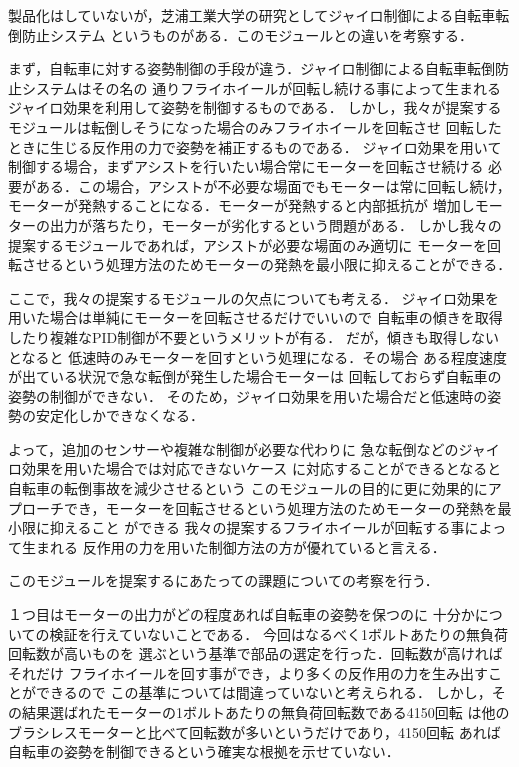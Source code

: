 \documentclass[uplatex,dvipdfmx]{jsarticle}
\begin{document}
製品化はしていないが，芝浦工業大学の研究としてジャイロ制御による自転車転倒防止システム
というものがある．このモジュールとの違いを考察する．

まず，自転車に対する姿勢制御の手段が違う．ジャイロ制御による自転車転倒防止システムはその名の
通りフライホイールが回転し続ける事によって生まれるジャイロ効果を利用して姿勢を制御するものである．
しかし，我々が提案するモジュールは転倒しそうになった場合のみフライホイールを回転させ
回転したときに生じる反作用の力で姿勢を補正するものである．
ジャイロ効果を用いて制御する場合，まずアシストを行いたい場合常にモーターを回転させ続ける
必要がある．この場合，アシストが不必要な場面でもモーターは常に回転し続け，
モーターが発熱することになる．モーターが発熱すると内部抵抗が
増加しモーターの出力が落ちたり，モーターが劣化するという問題がある．
しかし我々の提案するモジュールであれば，アシストが必要な場面のみ適切に
モーターを回転させるという処理方法のためモーターの発熱を最小限に抑えることができる．


ここで，我々の提案するモジュールの欠点についても考える．
ジャイロ効果を用いた場合は単純にモーターを回転させるだけでいいので
自転車の傾きを取得したり複雑なPID制御が不要というメリットが有る．
だが，傾きも取得しないとなると
低速時のみモーターを回すという処理になる．その場合
ある程度速度が出ている状況で急な転倒が発生した場合モーターは
回転しておらず自転車の姿勢の制御ができない．
そのため，ジャイロ効果を用いた場合だと低速時の姿勢の安定化しかできなくなる．

よって，追加のセンサーや複雑な制御が必要な代わりに
急な転倒などのジャイロ効果を用いた場合では対応できないケース
に対応することができるとなると自転車の転倒事故を減少させるという
このモジュールの目的に更に効果的にアプローチでき，モーターを回転させるという処理方法のためモーターの発熱を最小限に抑えること
ができる
我々の提案するフライホイールが回転する事によって生まれる
反作用の力を用いた制御方法の方が優れていると言える．




このモジュールを提案するにあたっての課題についての考察を行う．

１つ目はモーターの出力がどの程度あれば自転車の姿勢を保つのに
十分かについての検証を行えていないことである．
今回はなるべく1ボルトあたりの無負荷回転数が高いものを
選ぶという基準で部品の選定を行った．回転数が高ければそれだけ
フライホイールを回す事ができ，より多くの反作用の力を生み出すことができるので
この基準については間違っていないと考えられる．
しかし，その結果選ばれたモーターの1ボルトあたりの無負荷回転数である4150回転
は他のブラシレスモーターと比べて回転数が多いというだけであり，4150回転
あれば自転車の姿勢を制御できるという確実な根拠を示せていない．
\end{document}
